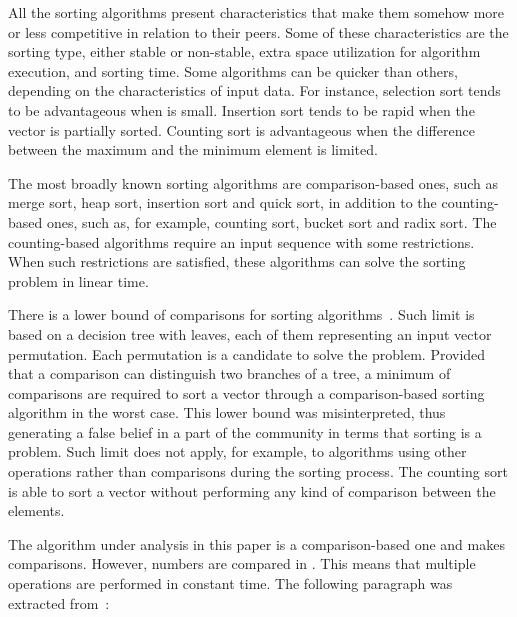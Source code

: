 \documentclass[11pt]{article}
\begin{document}
 All the sorting algorithms present characteristics that make them somehow more or less competitive in relation to their peers. Some of these characteristics are the sorting type, either stable or non-stable, extra space utilization for algorithm execution, and sorting time. Some algorithms can be quicker than others, depending on the characteristics of input data. For instance, selection sort tends to be advantageous when  is small. Insertion sort tends to be rapid when the vector is partially sorted. Counting sort is advantageous when the difference between the maximum and the minimum element is limited. 
 



The most broadly known sorting algorithms are comparison-based ones, such as merge sort, heap sort, insertion sort and quick sort, in addition to the counting-based ones, such as, for example, counting sort, bucket sort and radix sort. The counting-based algorithms require an input sequence with some restrictions. When such restrictions are satisfied, these algorithms can solve the sorting problem in linear time.




There is a lower bound of  comparisons for sorting algorithms~\cite{knuth}. Such limit is based on a decision tree with  leaves, each of them representing an input vector permutation. Each permutation is a candidate to solve the problem. Provided that a comparison can distinguish two branches of a tree, a minimum of  comparisons are required to sort a vector through a comparison-based sorting algorithm in the worst case. This lower bound was misinterpreted, thus generating a false belief in a part of the community in terms that sorting is a   problem. Such limit does not apply, for example, to algorithms using other operations rather than comparisons during the sorting process. The counting sort is able to sort a vector without performing any kind of comparison between the elements.




The algorithm under analysis in this paper is a comparison-based one and makes   comparisons. However,  numbers are compared in . This means that multiple operations are performed in constant time. The following paragraph was extracted from~\cite{cormen}:
\end{document}
